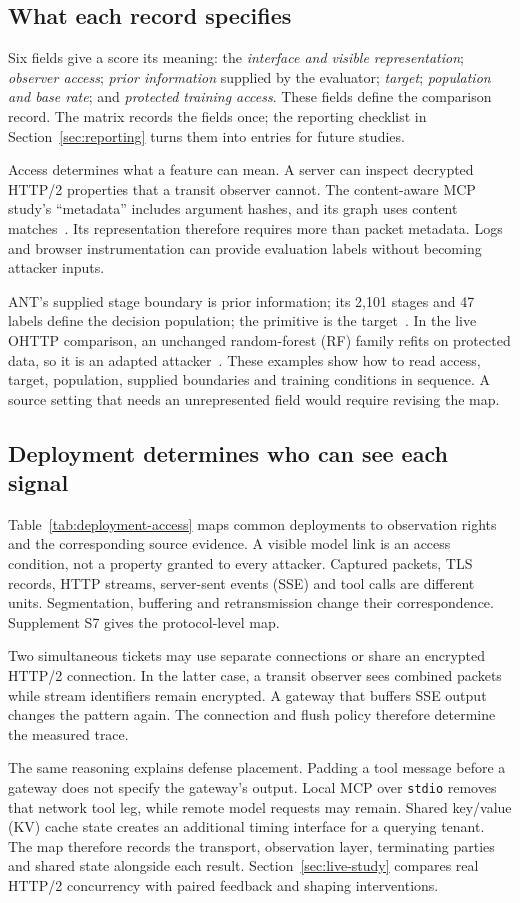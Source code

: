 \subsection{What each record specifies}
Six fields give a score its meaning: the \emph{interface and visible representation}; \emph{observer access}; \emph{prior information} supplied by the evaluator; \emph{target}; \emph{population and base rate}; and \emph{protected training access}. These fields define the comparison record. The matrix records the fields once; the reporting checklist in Section~\ref{sec:reporting} turns them into entries for future studies.

Access determines what a feature can mean. A server can inspect decrypted HTTP/2 properties that a transit observer cannot. The content-aware MCP study's ``metadata'' includes argument hashes, and its graph uses content matches~\cite[Secs.~4.1--4.2]{zavrak2026content}. Its representation therefore requires more than packet metadata. Logs and browser instrumentation can provide evaluation labels without becoming attacker inputs.

ANT's supplied stage boundary is prior information; its 2,101 stages and 47 labels define the decision population; the primitive is the target~\cite{li2026ant}. In the live OHTTP comparison, an unchanged random-forest (RF) family refits on protected data, so it is an adapted attacker~\cite{dangol2026workflow}. These examples show how to read access, target, population, supplied boundaries and training conditions in sequence. A source setting that needs an unrepresented field would require revising the map.

\subsection{Deployment determines who can see each signal}
Table~\ref{tab:deployment-access} maps common deployments to observation rights and the corresponding source evidence. A visible model link is an access condition, not a property granted to every attacker. Captured packets, TLS records, HTTP streams, server-sent events (SSE) and tool calls are different units. Segmentation, buffering and retransmission change their correspondence. Supplement S7 gives the protocol-level map.

Two simultaneous tickets may use separate connections or share an encrypted HTTP/2 connection. In the latter case, a transit observer sees combined packets while stream identifiers remain encrypted. A gateway that buffers SSE output changes the pattern again. The connection and flush policy therefore determine the measured trace.



The same reasoning explains defense placement. Padding a tool message before a gateway does not specify the gateway's output. Local MCP over \texttt{stdio} removes that network tool leg, while remote model requests may remain. Shared key/value (KV) cache state creates an additional timing interface for a querying tenant. The map therefore records the transport, observation layer, terminating parties and shared state alongside each result. Section~\ref{sec:live-study} compares real HTTP/2 concurrency with paired feedback and shaping interventions.
